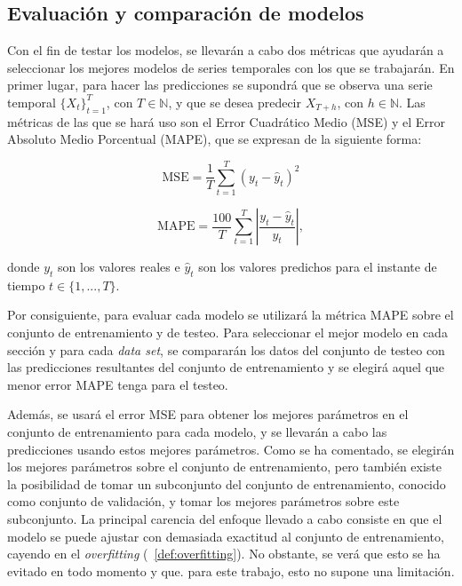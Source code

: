 \documentclass[12pt,twoside]{article}
\begin{document}
\subsection{Evaluación y comparación de modelos}

Con el fin de testar los modelos, se llevarán a cabo dos métricas que ayudarán a seleccionar los mejores modelos de series temporales con los que se trabajarán. En primer lugar, para hacer las predicciones se supondrá que se observa una serie temporal $\{X_t\}_{t=1}^{T}$, con $T \in \mathbb{N}$, y que se desea predecir $X_{T+h}$, con $h \in \mathbb{N}$. Las métricas de las que se hará uso son el Error Cuadrático Medio (MSE) y el Error Absoluto Medio Porcentual (MAPE), que se expresan de la siguiente forma: 

\begin{equation}
\mathrm{MSE} = \frac{1}{T} \sum_{t=1}^{T} (y_t - \hat{y}_t)^2
\end{equation}

\begin{equation}
\mathrm{MAPE} = \frac{100}{T} \sum_{t=1}^{T} \left| \frac{y_t - \hat{y}_t}{y_t} \right|,
\end{equation}

donde $y_t$ son los valores reales e $\hat{y}_t$ son los valores predichos para el instante de tiempo $t \in \{1,...,T\}$.

Por consiguiente, para evaluar cada modelo se utilizará la métrica MAPE sobre el conjunto de entrenamiento y de testeo. Para seleccionar el mejor modelo en cada sección y para cada \textit{data set}, se compararán los datos del conjunto de testeo con las predicciones resultantes del conjunto de entrenamiento y se elegirá aquel que menor error MAPE tenga para el testeo.

Además, se usará el error MSE para obtener los mejores parámetros en el conjunto de entrenamiento para cada modelo, y se llevarán a cabo las predicciones usando estos mejores parámetros. Como se ha comentado, se elegirán los mejores parámetros sobre el conjunto de entrenamiento, pero también existe la posibilidad de tomar un subconjunto del conjunto de entrenamiento, conocido como conjunto de validación, y tomar los mejores parámetros sobre este subconjunto. La principal carencia del enfoque llevado a cabo consiste en que el modelo se puede ajustar con demasiada exactitud al conjunto de entrenamiento, cayendo en el \textit{overfitting} (~\ref{def:overfitting}). No obstante, se verá que esto se ha evitado en todo momento y que. para este trabajo, esto no supone una limitación.
\end{document}

